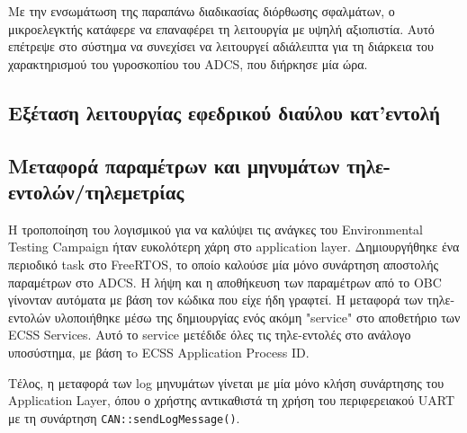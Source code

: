 \documentclass[a4paper,nobib,justified]{tufte-book}
\begin{document}
Με την ενσωμάτωση της παραπάνω διαδικασίας διόρθωσης σφαλμάτων, ο μικροελεγκτής κατάφερε να επαναφέρει τη λειτουργία με υψηλή αξιοπιστία. Αυτό επέτρεψε στο σύστημα να συνεχίσει να λειτουργεί αδιάλειπτα για τη διάρκεια του χαρακτηρισμού του γυροσκοπίου του ADCS, που διήρκησε μία ώρα.

\subsection{Εξέταση λειτουργίας εφεδρικού διαύλου κατ'εντολή}

\subsection{Μεταφορά παραμέτρων και μηνυμάτων τηλε-εντολών/τηλεμετρίας}
Η τροποποίηση του λογισμικού για να καλύψει τις ανάγκες του Environmental Testing Campaign ήταν ευκολότερη χάρη στο application layer. Δημιουργήθηκε ένα περιοδικό task στο FreeRTOS, το οποίο καλούσε μία μόνο συνάρτηση αποστολής παραμέτρων στο ADCS. Η λήψη και η αποθήκευση των παραμέτρων από το OBC γίνονταν αυτόματα με βάση τον κώδικα που είχε ήδη γραφτεί. Η μεταφορά των τηλε-εντολών υλοποιήθηκε μέσω της δημιουργίας ενός ακόμη "service" στο αποθετήριο των ECSS Services. Αυτό το service μετέδιδε όλες τις τηλε-εντολές στο ανάλογο υποσύστημα, με βάση τo ECSS Application Process ID.

Τέλος, η μεταφορά των log μηνυμάτων γίνεται με μία μόνο κλήση συνάρτησης του Application Layer, όπου ο χρήστης αντικαθιστά τη χρήση του περιφερειακού UART με τη συνάρτηση \texttt{CAN::sendLogMessage()}.
\end{document}
